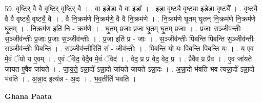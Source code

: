\documentclass[17pt]{extarticle}
\begin{document}
59. वृष्टि॒र् वै वै वृष्टि॒र् वृष्टि॒र् वै । . वा इडेडा॒ वै वा इडा᳚ । . इडा॒ वृष्ट्यै॒ वृष्ट्या॒ इडेडा॒ वृष्ट्यै᳚ । . वृष्ट्यै॒ वै वै वृष्ट्यै॒ वृष्ट्यै॒ वै । . वै नि॒क्रम॑णे नि॒क्रम॑णे॒ वै वै नि॒क्रम॑णे । . नि॒क्रम॑णे घृ॒तम् घृ॒तन् नि॒क्रम॑णे नि॒क्रम॑णे घृ॒तम् । . नि॒क्रम॑ण॒ इति॑ नि - क्रम॑णे । . घृ॒तम् प्र॒जाः प्र॒जा घृ॒तम् घृ॒तम् प्र॒जाः । . प्र॒जाः स॒ञ्जीव॑न्तीः स॒ञ्जीव॑न्तीः प्र॒जाः प्र॒जाः स॒ञ्जीव॑न्तीः । . प्र॒जा इति॑ प्र - जाः । . स॒ञ्जीव॑न्तीः पिबन्ति पिबन्ति स॒ञ्जीव॑न्तीः स॒ञ्जीव॑न्तीः पिबन्ति । . स॒ञ्जीव॑न्ती॒रिति॑ सं - जीव॑न्तीः । . पि॒ब॒न्ति॒ यो यः पि॑बन्ति पिबन्ति॒ यः । . य ए॒व मे॒वं ॅयो य ए॒वम् । . ए॒वं ॅवेद॒ वेदै॒व मे॒वं ॅवेद॑ । . वेद॒ प्र प्र वेद॒ वेद॒ प्र । . प्रैवैव प्र प्रैव । . ए॒व जा॑यते जायत ए॒वैव जा॑यते । . जा॒य॒ते॒ ऽन्ना॒दो᳚ ऽन्ना॒दो जा॑यते जायते ऽन्ना॒दः । . अ॒न्ना॒दो भ॑वति भव त्यन्ना॒दो᳚ ऽन्ना॒दो भ॑वति । . अ॒न्ना॒द इत्य॑न्न - अ॒दः । . भ॒व॒तीति॑ भवति । \newline

\textbf{Ghana Paata } \newline
\end{document}
